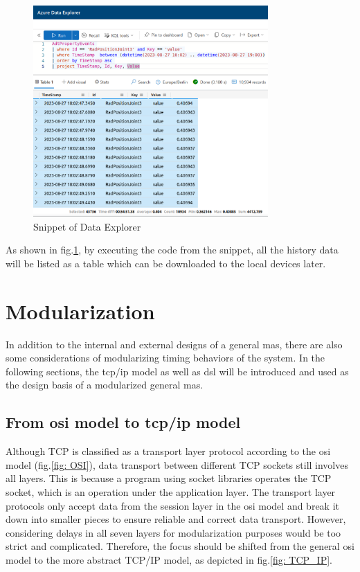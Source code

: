 \begin{figure}[htb]
    \includegraphics[width=0.8\textwidth]{figures/KQL_cut.jpg}
    
    \centering
    \caption{Snippet of Data Explorer\label{fig: KQL}}
\end{figure}

As shown in fig.\ref{fig: KQL}, by executing the code from the snippet, all the history data will be listed as a table 
which can be downloaded to the local devices later. 


\section{Modularization}\label{chap: Meth-Modular}
In addition to the internal and external designs of a general \gls{mas}, 
there are also some considerations of modularizing timing behaviors of the 
system. In the following sections, the \gls{tcp/ip} model as well as 
\gls{dsl} will be introduced and used as the design basis of a modularized general 
\gls{mas}. 
\subsection{From \gls{osi} model to \gls{tcp/ip} model}

Although TCP is classified as a transport layer protocol according to the 
\gls{osi} model (fig.\ref{fig: OSI}), data transport between different TCP sockets 
still involves all layers. This is because a program using socket libraries 
operates the TCP socket, which is an operation under the application layer. 
The transport layer protocols only accept data from the session layer in the 
\gls{osi} model and break it down into smaller pieces to ensure reliable and correct 
data transport. However, considering delays in all seven layers for modularization 
purposes would be too strict and complicated. Therefore, the focus should be 
shifted from the general \gls{osi} model to the more abstract TCP/IP model, as depicted 
in fig.\ref{fig: TCP_IP}.

